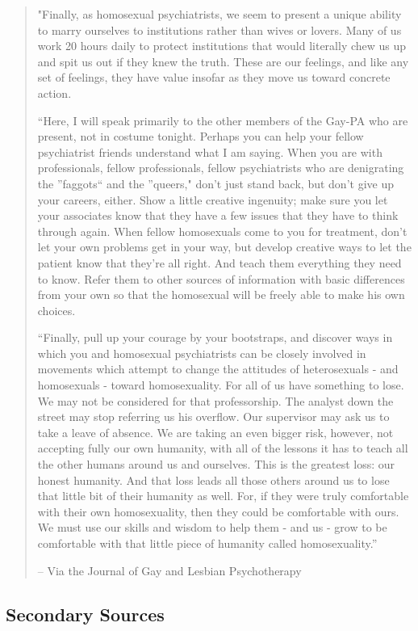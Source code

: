 \begin{refsection}
\begin{quote}
"Finally, as homosexual psychiatrists, we seem to present a unique ability to marry ourselves to institutions rather than wives or lovers. Many of us work 20 hours daily to protect institutions that would literally chew us up and spit us out if they knew the truth. These are our feelings, and like any set of feelings, they have value insofar as they move us toward concrete action.

``Here, I will speak primarily to the other members of the Gay-PA who are present, not in costume tonight. Perhaps you can help your fellow psychiatrist friends understand what I am saying. When you are with professionals, fellow professionals, fellow psychiatrists who are denigrating the ''faggots`` and the ''queers," don't just stand back, but don't give up your careers, either. Show a little creative ingenuity; make sure you let your associates know that they have a few issues that they have to think through again. When fellow homosexuals come to you for treatment, don't let your own problems get in your way, but develop creative ways to let the patient know that they're all right. And teach them everything they need to know. Refer them to other sources of information with basic differences from your own so that the homosexual will be freely able to make his own choices.

``Finally, pull up your courage by your bootstraps, and discover ways in which you and homosexual psychiatrists can be closely involved in movements which attempt to change the attitudes of heterosexuals - and homosexuals - toward homosexuality. For all of us have something to lose. We may not be considered for that professorship. The analyst down the street may stop referring us his overflow. Our supervisor may ask us to take a leave of absence. We are taking an even bigger risk, however, not accepting fully our own humanity, with all of the lessons it has to teach all the other humans around us and ourselves. This is the greatest loss: our honest humanity. And that loss leads all those others around us to lose that little bit of their humanity as well. For, if they were truly comfortable with their own homosexuality, then they could be comfortable with ours. We must use our skills and wisdom to help them - and us - grow to be comfortable with that little piece of humanity called homosexuality.''

– Via the Journal of Gay and Lesbian Psychotherapy
\end{quote}

\subsection{Secondary Sources}
\label{secondarysources}


\end{refsection}
